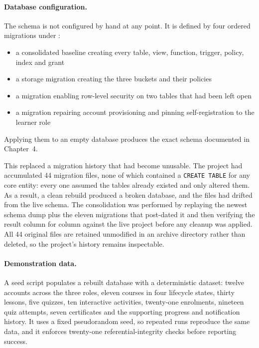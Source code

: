 \documentclass[12pt, oneside]{article} %
\newcommand{\tcode}[1]{\path{#1}}
\begin{document}
\paragraph{Database configuration.} The schema is not configured by hand at any point. It is defined by four ordered migrations under \tcode{supabase/migrations/}:

\begin{itemize}
    \item a consolidated baseline creating every table, view, function, trigger, policy, index and grant
    \item a storage migration creating the three buckets and their policies
    \item a migration enabling row-level security on two tables that had been left open
    \item a migration repairing account provisioning and pinning self-registration to the learner role
\end{itemize}

Applying them to an empty database produces the exact schema documented in Chapter~4.

This replaced a migration history that had become unusable. The project had accumulated 44 migration files, none of which contained a \texttt{CREATE TABLE} for any core entity: every one assumed the tables already existed and only altered them. As a result, a clean rebuild produced a broken database, and the files had drifted from the live schema. The consolidation was performed by replaying the newest schema dump plus the eleven migrations that post-dated it and then verifying the result column for column against the live project before any cleanup was applied. All 44 original files are retained unmodified in an archive directory rather than deleted, so the project's history remains inspectable.

\paragraph{Demonstration data.} A seed script populates a rebuilt database with a deterministic dataset: twelve accounts across the three roles, eleven courses in four lifecycle states, thirty lessons, five quizzes, ten interactive activities, twenty-one enrolments, nineteen quiz attempts, seven certificates and the supporting progress and notification history. It uses a fixed pseudorandom seed, so repeated runs reproduce the same data, and it enforces twenty-one referential-integrity checks before reporting success.
\end{document}
